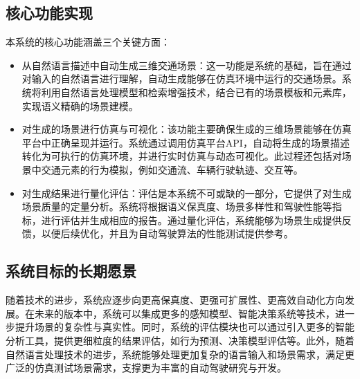 \subsection{核心功能实现}
本系统的核心功能涵盖三个关键方面：
\begin{itemize}
	\item 从自然语言描述中自动生成三维交通场景：这一功能是系统的基础，旨在通过对输入的自然语言进行理解，自动生成能够在仿真环境中运行的交通场景。系统将利用自然语言处理模型和检索增强技术，结合已有的场景模板和元素库，实现语义精确的场景建模。
	\item 对生成的场景进行仿真与可视化：该功能主要确保生成的三维场景能够在仿真平台中正确呈现并运行。系统通过调用仿真平台API，自动将生成的场景描述转化为可执行的仿真环境，并进行实时仿真与动态可视化。此过程还包括对场景中交通元素的行为模拟，例如交通流、车辆行驶轨迹、交互等。
	\item 对生成结果进行量化评估：评估是本系统不可或缺的一部分，它提供了对生成场景质量的定量分析。系统将根据语义保真度、场景多样性和驾驶性能等指标，进行评估并生成相应的报告。通过量化评估，系统能够为场景生成提供反馈，以便后续优化，并且为自动驾驶算法的性能测试提供参考。
\end{itemize}

\subsection{系统目标的长期愿景}
随着技术的进步，系统应逐步向更高保真度、更强可扩展性、更高效自动化方向发展。在未来的版本中，系统可以集成更多的感知模型、智能决策系统等技术，进一步提升场景的复杂性与真实性。同时，系统的评估模块也可以通过引入更多的智能分析工具，提供更细粒度的结果评估，如行为预测、决策模型评估等。此外，随着自然语言处理技术的进步，系统能够处理更加复杂的语言输入和场景需求，满足更广泛的仿真测试场景需求，支撑更为丰富的自动驾驶研究与开发。

